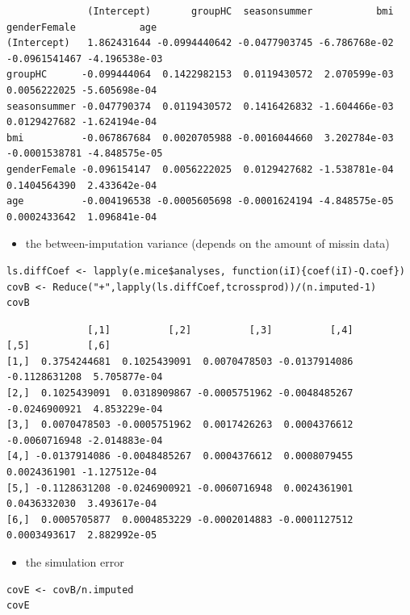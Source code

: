 \documentclass[12pt]{article}
\begin{document}
\begin{verbatim}
              (Intercept)       groupHC  seasonsummer           bmi  genderFemale           age
(Intercept)   1.862431644 -0.0994440642 -0.0477903745 -6.786768e-02 -0.0961541467 -4.196538e-03
groupHC      -0.099444064  0.1422982153  0.0119430572  2.070599e-03  0.0056222025 -5.605698e-04
seasonsummer -0.047790374  0.0119430572  0.1416426832 -1.604466e-03  0.0129427682 -1.624194e-04
bmi          -0.067867684  0.0020705988 -0.0016044660  3.202784e-03 -0.0001538781 -4.848575e-05
genderFemale -0.096154147  0.0056222025  0.0129427682 -1.538781e-04  0.1404564390  2.433642e-04
age          -0.004196538 -0.0005605698 -0.0001624194 -4.848575e-05  0.0002433642  1.096841e-04
\end{verbatim}

\begin{itemize}
\item the between-imputation variance (depends on the amount of missin data)
\end{itemize}
\lstset{language=r,label= ,caption= ,captionpos=b,numbers=none}
\begin{lstlisting}
ls.diffCoef <- lapply(e.mice$analyses, function(iI){coef(iI)-Q.coef})
covB <- Reduce("+",lapply(ls.diffCoef,tcrossprod))/(n.imputed-1)
covB
\end{lstlisting}

\begin{verbatim}
              [,1]          [,2]          [,3]          [,4]          [,5]          [,6]
[1,]  0.3754244681  0.1025439091  0.0070478503 -0.0137914086 -0.1128631208  5.705877e-04
[2,]  0.1025439091  0.0318909867 -0.0005751962 -0.0048485267 -0.0246900921  4.853229e-04
[3,]  0.0070478503 -0.0005751962  0.0017426263  0.0004376612 -0.0060716948 -2.014883e-04
[4,] -0.0137914086 -0.0048485267  0.0004376612  0.0008079455  0.0024361901 -1.127512e-04
[5,] -0.1128631208 -0.0246900921 -0.0060716948  0.0024361901  0.0436332030  3.493617e-04
[6,]  0.0005705877  0.0004853229 -0.0002014883 -0.0001127512  0.0003493617  2.882992e-05
\end{verbatim}

\begin{itemize}
\item the simulation error
\end{itemize}
\lstset{language=r,label= ,caption= ,captionpos=b,numbers=none}
\begin{lstlisting}
covE <- covB/n.imputed
covE
\end{lstlisting}
\end{document}
